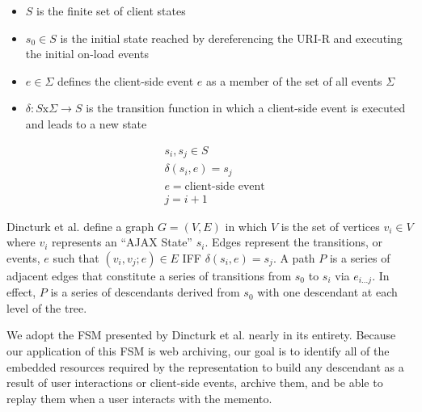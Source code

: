 \documentclass{sig-alternate}
\begin{document}
\begin{itemize}
\item $S$ is the finite set of client states
\item $s_0 \in S$ is the initial state reached by dereferencing the URI-R and executing the initial on-load events
\item $e \in \Sigma$ defines the client-side event $e$ as a member of the set of all events $\Sigma$
\item $\delta : S \text{x} \Sigma \rightarrow S$ is the transition function in which a client-side event is executed and leads to a new state
\end{itemize}

\begin{equation}
\begin{split} 
&s_i, s_j \in S\\
&\delta(s_i, e) = s_j\\
&e = \text{client-side event}\\
&j = i+1
\end{split}
\label{statedef}
\end{equation}


Dincturk et al. define a graph $G=(V, E)$ in which $V$ is the set of vertices $v_i \in V$ where $v_i$ represents an ``AJAX State'' $s_i$. Edges represent the transitions, or events, $e$ such that $(v_i, v_j;e) \in E$ IFF $\delta(s_i, e)=s_j$. A path $P$ is a series of adjacent edges that constitute a series of transitions from $s_0$ to $s_i$ via $e_{i...j}$. In effect, $P$ is a series of descendants derived from $s_0$ with one descendant at each level of the tree.

We adopt the FSM presented by Dincturk et al. nearly in its entirety. Because our application of this FSM is web archiving, our goal is to identify all of the embedded resources required by the representation to build any descendant as a result of user interactions or client-side events, archive them, and be able to replay them when a user interacts with the memento. 
\end{document}
